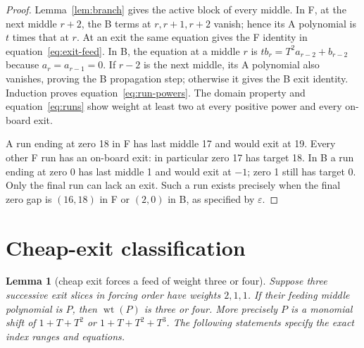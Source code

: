 \documentclass{article}
\newtheorem{lemma}{Lemma}
\DeclareMathOperator{\wt}{wt}
\begin{document}
\begin{proof}
  Lemma~\ref{lem:branch} gives the active block of every middle. In F, at the next
  middle \(r + 2\), the B terms at \(r, r + 1, r + 2\) vanish; hence its A polynomial
  is \(t\) times that at \(r\). At an exit the same equation gives the F identity
  in equation~\eqref{eq:exit-feed}. In B, the equation at a middle \(r\) is
  \(t b_r = T^2 a_{r-2} + b_{r-2}\) because \(a_r = a_{r-1} = 0\). If \(r - 2\) is the next
  middle, its A polynomial also vanishes, proving the B propagation step;
  otherwise it gives the B exit identity. Induction proves equation~\eqref{eq:run-powers}.
  The domain property and equation~\eqref{eq:runs} show weight at least two at every positive
  power and every on-board exit.

  A run ending at zero 18 in F has last middle 17 and would exit at 19.
  Every other F run has an on-board exit: in particular zero 17 has target
  18. In B a run ending at zero 0 has last middle 1 and would exit at \(-1\);
  zero 1 still has target 0. Only the final run can lack an exit. Such a run
  exists precisely when the final zero gap is \((16, 18)\) in F or \((2, 0)\) in B,
  as specified by \(\varepsilon\).
\end{proof}

\section{Cheap-exit classification}\label{sec:cheap}

\begin{lemma}[cheap exit forces a feed of weight three or four]\label{lem:cheap-exit}
  Suppose three
  successive exit slices in forcing order have weights \(2, 1, 1\). If their
  feeding middle polynomial is \(P\), then \(\wt(P)\) is three or four. More
  precisely \(P\) is a monomial shift of \(1 + T + T^2\) or \(1 + T + T^2 + T^3\).
  The following statements specify the exact index ranges and equations.
\end{lemma}
\end{document}
